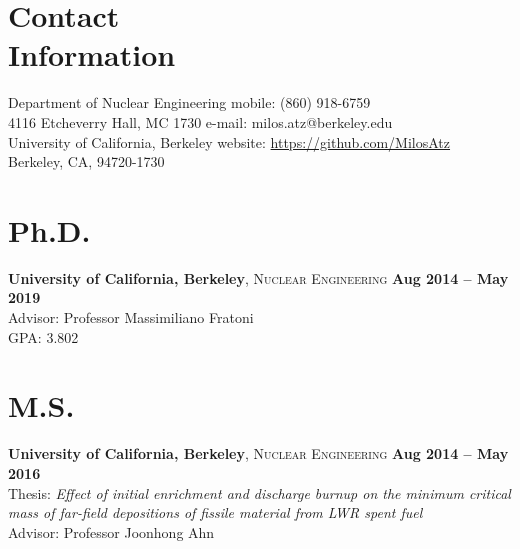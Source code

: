 \documentclass[margin,line]{resume}
\begin{document}
\begin{resume}

\section{\mysidestyle Contact\\Information}
    Department of Nuclear Engineering 
        \hfill mobile: (860) 918-6759 \\
    4116 Etcheverry Hall, MC 1730 
        \hfill e-mail: milos.atz@berkeley.edu \\
    University of California, Berkeley 
        \hfill website: \url{https://github.com/MilosAtz} \\
    Berkeley, CA, 94720-1730
    
%
%
%
%

\section{\mysidestyle Ph.D.}
    \textbf{University of California, Berkeley}, 
    \textsc{Nuclear Engineering} \hfill 
    \textbf{Aug 2014 -- May 2019} \vspace{1mm} \\
    Advisor: Professor Massimiliano Fratoni \\
    GPA: 3.802 \\

\section{\mysidestyle M.S.}
    \textbf{University of California, Berkeley}, 
    \textsc{Nuclear Engineering} \hfill 
    \textbf{Aug 2014 -- May 2016} \vspace{1mm} \\
    Thesis: \textsl{Effect of initial enrichment and discharge burnup on the minimum critical mass of far-field depositions of fissile material from LWR spent fuel} \\
    Advisor: Professor Joonhong Ahn \\


\end{resume}
\end{document}
